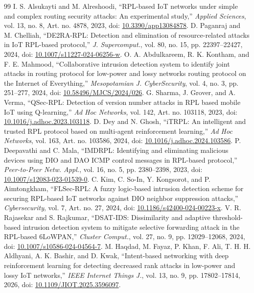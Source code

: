 \begin{thebibliography}{99}
 I. S. Alsukayti and M. Alreshoodi, ``RPL-based IoT networks under simple and complex routing security attacks: An experimental study,'' \emph{Applied Sciences}, vol. 13, no. 8, Art. no. 4878, 2023, doi: \href{https://doi.org/10.3390/app13084878}{10.3390/app13084878}.
 D. Paganraj and M. Chelliah, ``DE2RA-RPL: Detection and elimination of resource-related attacks in IoT RPL-based protocol,'' \emph{J. Supercomput.}, vol. 80, no. 15, pp. 22397--22427, 2024, doi: \href{https://doi.org/10.1007/s11227-024-06256-w}{10.1007/s11227-024-06256-w}.
 O. A. Abdulkareem, R. K. Kontham, and F. E. Mahmood, ``Collaborative intrusion detection system to identify joint attacks in routing protocol for low-power and lossy networks routing protocol on the Internet of Everything,'' \emph{Mesopotamian J. CyberSecurity}, vol. 4, no. 3, pp. 251--277, 2024, doi: \href{https://doi.org/10.58496/MJCS/2024/026}{10.58496/MJCS/2024/026}.
 G. Sharma, J. Grover, and A. Verma, ``QSec-RPL: Detection of version number attacks in RPL based mobile IoT using Q-learning,'' \emph{Ad Hoc Networks}, vol. 142, Art. no. 103118, 2023, doi: \href{https://doi.org/10.1016/j.adhoc.2023.103118}{10.1016/j.adhoc.2023.103118}.
 D. Dey and N. Ghosh, ``iTRPL: An intelligent and trusted RPL protocol based on multi-agent reinforcement learning,'' \emph{Ad Hoc Networks}, vol. 163, Art. no. 103586, 2024, doi: \href{https://doi.org/10.1016/j.adhoc.2024.103586}{10.1016/j.adhoc.2024.103586}.
 P. Deepavathi and C. Mala, ``IMDRPL: Identifying and eliminating malicious devices using DIO and DAO ICMP control messages in RPL-based protocol,'' \emph{Peer-to-Peer Netw. Appl.}, vol. 16, no. 5, pp. 2380--2398, 2023, doi: \href{https://doi.org/10.1007/s12083-023-01539-0}{10.1007/s12083-023-01539-0}.
 C. Kim, C. So-In, Y. Kongsorot, and P. Aimtongkham, ``FLSec-RPL: A fuzzy logic-based intrusion detection scheme for securing RPL-based IoT networks against DIO neighbor suppression attacks,'' \emph{Cybersecurity}, vol. 7, Art. no. 27, 2024, doi: \href{https://doi.org/10.1186/s42400-024-00223-x}{10.1186/s42400-024-00223-x}.
 V. R. Rajasekar and S. Rajkumar, ``DSAT-IDS: Dissimilarity and adaptive threshold-based intrusion detection system to mitigate selective forwarding attack in the RPL-based 6LoWPAN,'' \emph{Cluster Comput.}, vol. 27, no. 9, pp. 12029--12068, 2024, doi: \href{https://doi.org/10.1007/s10586-024-04564-7}{10.1007/s10586-024-04564-7}.
 M. Haqdad, M. Fayaz, P. Khan, F. Ali, T. H. H. Aldhyani, A. K. Bashir, and D. Kwak, ``Intent-based networking with deep reinforcement learning for detecting decreased rank attacks in low-power and lossy IoT networks,'' \emph{IEEE Internet Things J.}, vol. 13, no. 9, pp. 17802--17814, 2026, doi: \href{https://doi.org/10.1109/JIOT.2025.3596097}{10.1109/JIOT.2025.3596097}.

\end{thebibliography}
